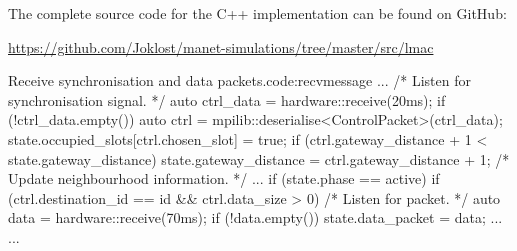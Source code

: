 The complete source code for the C++ implementation can be found on GitHub:

{\small \url{https://github.com/Joklost/manet-simulations/tree/master/src/lmac}}

\begin{cpp}{Receive synchronisation and data packets.}{code:recvmessage}
...
/* Listen for synchronisation signal. */
auto ctrl_data = hardware::receive(20ms);
if (!ctrl_data.empty()) {
    auto ctrl = mpilib::deserialise<ControlPacket>(ctrl_data);
    state.occupied_slots[ctrl.chosen_slot] = true;
    if (ctrl.gateway_distance + 1 < state.gateway_distance) {
        state.gateway_distance = ctrl.gateway_distance + 1;
    }
    /* Update neighbourhood information. */
    ...
    if (state.phase == active) {
        if (ctrl.destination_id == id && ctrl.data_size > 0) {
            /* Listen for packet. */
            auto data = hardware::receive(70ms);
            if (!data.empty()) {
                state.data_packet = data;
                ...
            } 
        }
    }
}
...    
\end{cpp}
